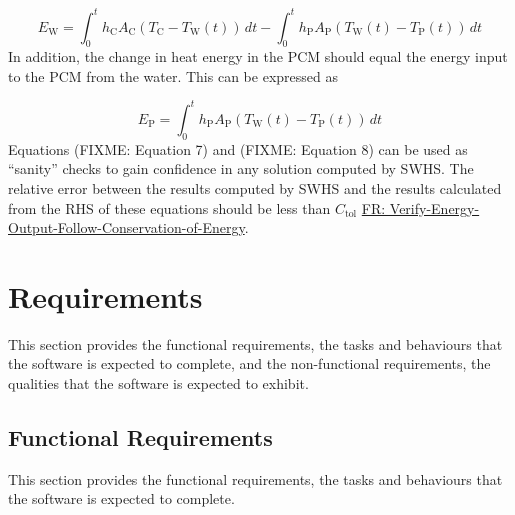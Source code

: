 \documentclass[12pt]{article}
\begin{document}
\begin{displaymath}
{E_{\text{W}}}=\int_{0}^{t}{{h_{\text{C}}} {A_{\text{C}}} \left({T_{\text{C}}}-{T_{\text{W}}}\left(t\right)\right)}\,dt-\int_{0}^{t}{{h_{\text{P}}} {A_{\text{P}}} \left({T_{\text{W}}}\left(t\right)-{T_{\text{P}}}\left(t\right)\right)}\,dt
\end{displaymath}
In addition, the change in heat energy in the PCM should equal the energy input to the PCM from the water. This can be expressed as

\begin{displaymath}
{E_{\text{P}}}=\int_{0}^{t}{{h_{\text{P}}} {A_{\text{P}}} \left({T_{\text{W}}}\left(t\right)-{T_{\text{P}}}\left(t\right)\right)}\,dt
\end{displaymath}
Equations (FIXME: Equation 7) and (FIXME: Equation 8) can be used as ``sanity'' checks to gain confidence in any solution computed by SWHS. The relative error between the results computed by SWHS and the results calculated from the RHS of these equations should be less than ${C_{\text{tol}}}$ \hyperref[verifyEnergyOutput]{FR: Verify-Energy-Output-Follow-Conservation-of-Energy}.

\section{Requirements}
\label{Sec:Requirements}
This section provides the functional requirements, the tasks and behaviours that the software is expected to complete, and the non-functional requirements, the qualities that the software is expected to exhibit.

\subsection{Functional Requirements}
\label{Sec:FRs}
This section provides the functional requirements, the tasks and behaviours that the software is expected to complete.
\end{document}
